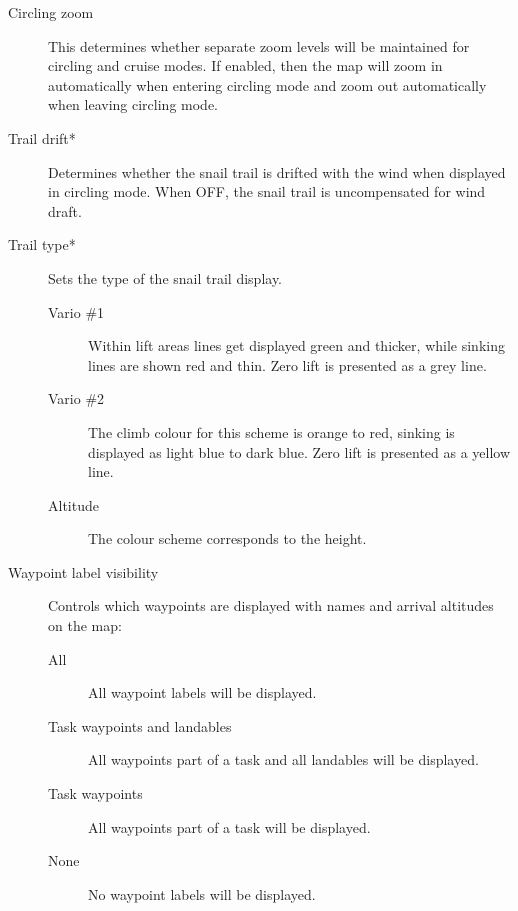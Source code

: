 \begin{description}
\item[Circling zoom] \label{conf:circlingzoom} This determines whether separate
zoom levels will be maintained for circling and cruise modes.  If enabled, then the 
map will zoom in automatically when entering circling mode and zoom out
automatically when leaving circling mode.

\item[Trail drift*] \label{conf:traildrift} Determines whether the
snail trail is drifted with the wind when displayed in circling mode.  When OFF,
the snail trail is uncompensated for wind draft.

\item[Trail type*] \label{conf:snailtype} Sets the type of the snail trail
display.
\begin{description}
\item[Vario \#1]  Within lift areas lines get displayed green and
thicker, while sinking lines are shown red and thin.  Zero lift
is presented as a grey line.
\item[Vario \#2]  The climb colour for this scheme is orange to red, sinking is
displayed as light blue to dark blue. Zero lift
is presented as a yellow line.
\item[Altitude] The colour scheme corresponds to the height.
\end{description}

\item[Waypoint label visibility] \label{conf:labelvisibility} Controls which waypoints are displayed with names and arrival altitudes on the map:
 \begin{description}
\item[All] All waypoint labels will be displayed.
\item[Task waypoints and landables] All waypoints part of a task and all landables will be displayed.
\item[Task waypoints] All waypoints part of a task will be displayed.
\item[None] No waypoint labels will be displayed.
 \end{description}


\end{description}
